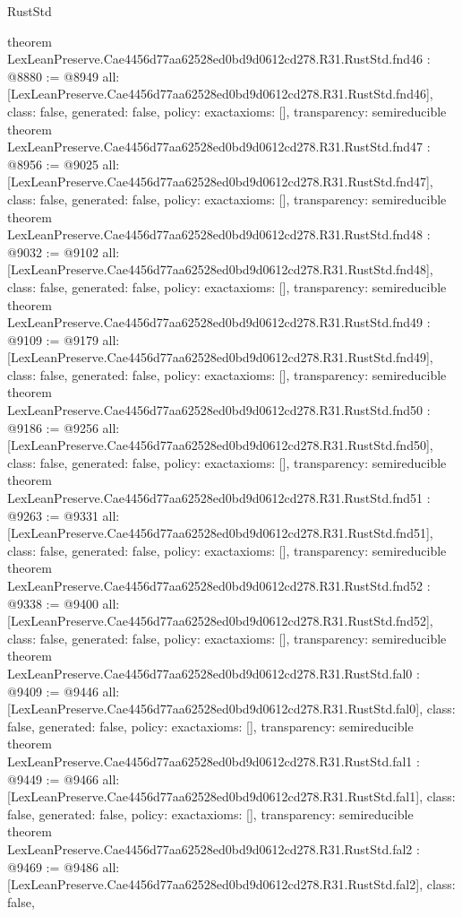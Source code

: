 \begin{lexlean}{RustStd}
\begin{coremodule}
{}
theorem LexLeanPreserve.Cae4456d77aa62528ed0bd9d0612cd278.R31.RustStd.fnd46 : @8880 := @8949 {
  all: [LexLeanPreserve.Cae4456d77aa62528ed0bd9d0612cd278.R31.RustStd.fnd46],
  class: false,
  generated: false,
  policy: exact{axioms: []},
  transparency: semireducible
}
theorem LexLeanPreserve.Cae4456d77aa62528ed0bd9d0612cd278.R31.RustStd.fnd47 : @8956 := @9025 {
  all: [LexLeanPreserve.Cae4456d77aa62528ed0bd9d0612cd278.R31.RustStd.fnd47],
  class: false,
  generated: false,
  policy: exact{axioms: []},
  transparency: semireducible
}
theorem LexLeanPreserve.Cae4456d77aa62528ed0bd9d0612cd278.R31.RustStd.fnd48 : @9032 := @9102 {
  all: [LexLeanPreserve.Cae4456d77aa62528ed0bd9d0612cd278.R31.RustStd.fnd48],
  class: false,
  generated: false,
  policy: exact{axioms: []},
  transparency: semireducible
}
theorem LexLeanPreserve.Cae4456d77aa62528ed0bd9d0612cd278.R31.RustStd.fnd49 : @9109 := @9179 {
  all: [LexLeanPreserve.Cae4456d77aa62528ed0bd9d0612cd278.R31.RustStd.fnd49],
  class: false,
  generated: false,
  policy: exact{axioms: []},
  transparency: semireducible
}
theorem LexLeanPreserve.Cae4456d77aa62528ed0bd9d0612cd278.R31.RustStd.fnd50 : @9186 := @9256 {
  all: [LexLeanPreserve.Cae4456d77aa62528ed0bd9d0612cd278.R31.RustStd.fnd50],
  class: false,
  generated: false,
  policy: exact{axioms: []},
  transparency: semireducible
}
theorem LexLeanPreserve.Cae4456d77aa62528ed0bd9d0612cd278.R31.RustStd.fnd51 : @9263 := @9331 {
  all: [LexLeanPreserve.Cae4456d77aa62528ed0bd9d0612cd278.R31.RustStd.fnd51],
  class: false,
  generated: false,
  policy: exact{axioms: []},
  transparency: semireducible
}
theorem LexLeanPreserve.Cae4456d77aa62528ed0bd9d0612cd278.R31.RustStd.fnd52 : @9338 := @9400 {
  all: [LexLeanPreserve.Cae4456d77aa62528ed0bd9d0612cd278.R31.RustStd.fnd52],
  class: false,
  generated: false,
  policy: exact{axioms: []},
  transparency: semireducible
}
theorem LexLeanPreserve.Cae4456d77aa62528ed0bd9d0612cd278.R31.RustStd.fal0 : @9409 := @9446 {
  all: [LexLeanPreserve.Cae4456d77aa62528ed0bd9d0612cd278.R31.RustStd.fal0],
  class: false,
  generated: false,
  policy: exact{axioms: []},
  transparency: semireducible
}
theorem LexLeanPreserve.Cae4456d77aa62528ed0bd9d0612cd278.R31.RustStd.fal1 : @9449 := @9466 {
  all: [LexLeanPreserve.Cae4456d77aa62528ed0bd9d0612cd278.R31.RustStd.fal1],
  class: false,
  generated: false,
  policy: exact{axioms: []},
  transparency: semireducible
}
theorem LexLeanPreserve.Cae4456d77aa62528ed0bd9d0612cd278.R31.RustStd.fal2 : @9469 := @9486 {
  all: [LexLeanPreserve.Cae4456d77aa62528ed0bd9d0612cd278.R31.RustStd.fal2],
  class: false,
}
\end{coremodule}
\end{lexlean}
